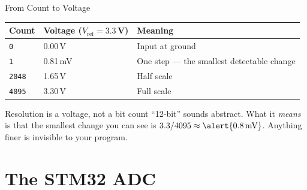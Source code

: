 \documentclass[9pt,aspectratio=169,xcolor=table]{beamer}
\begin{document}
\begin{frame}{From Count to Voltage}
    \begin{center}
    \end{center}

    \vspace{3mm}
    \begin{center}
    {\small
    \striped
    \begin{tabular}{@{}l l l@{}}
        \toprule
        \textbf{Count} & \textbf{Voltage} ($V_{\text{ref}} = 3.3$\,V) & \textbf{Meaning} \\
        \midrule
        \texttt{0}    & 0.00\,V  & Input at ground \\
        \texttt{1}    & 0.81\,mV & \alert{One step} --- the smallest detectable change \\
        \texttt{2048} & 1.65\,V  & Half scale \\
        \texttt{4095} & 3.30\,V  & Full scale \\
        \bottomrule
    \end{tabular}}
    \end{center}

    \vspace{3mm}
    \begin{block}{Resolution is a voltage, not a bit count}
        ``12-bit'' sounds abstract. What it \emph{means} is that the smallest
        change you can see is $3.3 / 4095 \approx \alert{0.8\,\text{mV}}$.
        Anything finer is invisible to your program.
    \end{block}
\end{frame}


\section{The STM32 ADC}
\end{document}

